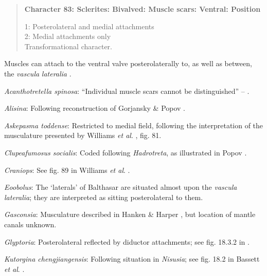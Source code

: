 \documentclass[openany]{book}
\begin{document}
\begin{quote}
\textbf{Character 83: Sclerites: Bivalved: Muscle scars: Ventral:
Position}

1: Posterolateral and medial attachments\\
2: Medial attachments only\\
Transformational character.
\end{quote}

Muscles can attach to the ventral valve posterolaterally to, as well as
between, the \emph{vascula} \emph{lateralia}
\citep{Popov1992TheCambrian}.

\hypertarget{Acanthotretella_spinosa-coding-83}{}
\emph{Acanthotretella spinosa}: ``Individual muscle scars cannot be
distinguished'' -- \citet{Holmer2006Aspinose}.

\hypertarget{Alisina-coding-83}{}
\emph{Alisina}: Following reconstruction of Gorjansky \& Popov
\citeyearpar{Gorjansky1986Onthe}.

\hypertarget{Askepasma_toddense-coding-83}{}
\emph{Askepasma toddense}: Restricted to medial field, following the
interpretation of the musculature presented by Williams \emph{et al}.
\citeyearpar{Williams2000LinguliformeaCraniiformea}, fig. 81.

\hypertarget{Clupeafumosus_socialis-coding-83}{}
\emph{Clupeafumosus socialis}: Coded following \emph{Hadrotreta}, as
illustrated in Popov \citeyearpar{Popov1992TheCambrian}.

\hypertarget{Craniops-coding-83}{}
\emph{Craniops}: See fig. 89 in Williams \emph{et al}.
\citeyearpar{Williams2000LinguliformeaCraniiformea}.

\hypertarget{Eoobolus-coding-83}{}
\emph{Eoobolus}: The `laterals' of Balthasar \citeyearpar[fig.
5]{Balthasar2009Thebrachiopod} are situated almost upon the
\emph{vascula} \emph{lateralia}; they are interpreted as sitting
posterolateral to them.

\hypertarget{Gasconsia-coding-83}{}
\emph{Gasconsia}: Musculature described in Hanken \& Harper
\citeyearpar{Hanken1985Thetaxonomy}, but location of mantle canals
unknown.

\hypertarget{Glyptoria-coding-83}{}
\emph{Glyptoria}: Posterolateral reflected by diductor attachments; see
fig. 18.3.2 in \citet{Bassett2001Functionalmorphology}.

\hypertarget{Kutorgina_chengjiangensis-coding-83}{}
\emph{Kutorgina chengjiangensis}: Following situation in \emph{Nisusia};
see fig. 18.2 in Bassett \emph{et al}.
\citeyearpar{Bassett2001Functionalmorphology}.
\end{document}

